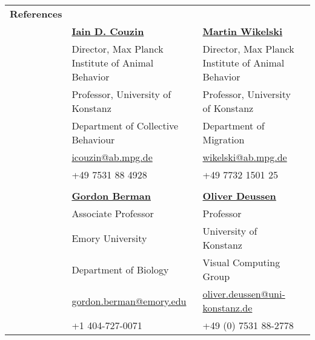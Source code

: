 \documentclass[letterpaper,10pt,oneside]{article}
\begin{document}

\noindent \begin{longtable}{@{} l p{3.5in}l p{3.5in}|}
 \Large{\textbf{References}} \vspace{5mm} \\
 & \href{https://www.ab.mpg.de/couzin}{\textbf{Iain D. Couzin}} & \href{https://www.ab.mpg.de/wikelski}{\textbf{Martin Wikelski}} \\
 & Director, Max Planck Institute of Animal Behavior &  Director, Max Planck Institute of Animal Behavior  \\
 & Professor, University of Konstanz &  Professor, University of Konstanz \\
 & Department of Collective Behaviour  & Department of Migration \\
 & \small{\href{mailto:icouzin@ab.mpg.de}{icouzin@ab.mpg.de}} & \small{\href{mailto:wikelski@ab.mpg.de}{wikelski@ab.mpg.de}} \\
 &\small{+49 7531 88 4928} & \small{+49 7732 1501 25} \\
&& \\
 & \href{http://www.biology.emory.edu/Berman/index.html}{\textbf{Gordon Berman}} & \href{https://www.cgmi.uni-konstanz.de/personen/prof-dr-oliver-deussen/}{\textbf{Oliver Deussen}} \\
& Associate Professor  &  Professor \\
& Emory University & University of Konstanz \\
& Department of Biology & Visual Computing Group \\
 & \small{\href{mailto:gordon.berman@emory.edu}{gordon.berman@emory.edu}} & \small{\href{mailto:oliver.deussen@uni-konstanz.de}{oliver.deussen@uni-konstanz.de}} \\
 &\small{+1 404-727-0071} & \small{+49 (0) 7531 88-2778} \\

\end{longtable}
\end{document}
